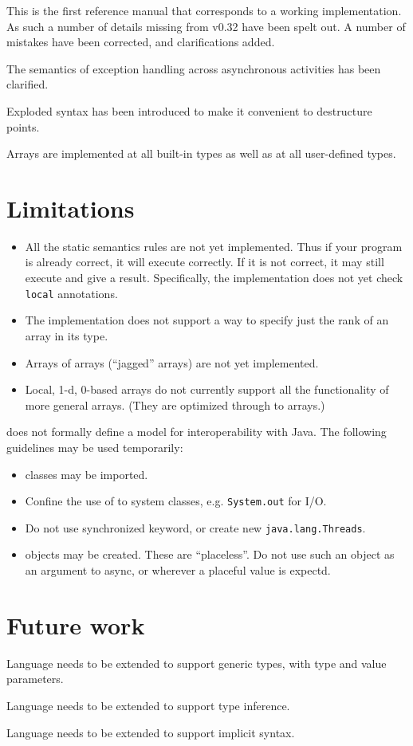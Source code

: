 
This is the first reference manual that corresponds to a working
implementation. As such a number of details missing from v0.32 have
been spelt out. A number of mistakes have been corrected, and
clarifications added.

The semantics of exception handling across asynchronous activities has
been clarified.

Exploded syntax has been introduced to make it convenient to
destructure points. 

Arrays are implemented at all built-in types as well as at all
user-defined types.

\section{Limitations}

\begin{itemize}
\item All the static semantics rules are not yet implemented. 
Thus if your program is already correct, it will execute correctly. If
it is not correct, it may still execute and give a
result. Specifically, the implementation does not yet check {\tt
local} annotations.

\item The implementation does not support a way to specify just the rank of
an array in its type.

\item Arrays of arrays (``jagged'' arrays) are not yet implemented.

\item Local, 1-d, 0-based arrays do not currently support all the
functionality of more general arrays. (They are optimized through to
\Java{} arrays.)

\end{itemize}

\XtenCurrVer{} does not formally define a model for interoperability with
Java. The following guidelines may be used temporarily:

\begin{itemize}
  \item \Java{} classes may be imported.
  \item Confine the use of \Java{} to system classes, e.g.{}
{\tt  System.out} for I/O.
  \item Do not use synchronized keyword, or create new {\tt java.lang.Threads}. 
  \item \Java{} objects may be created. These are ``placeless''. Do not use
     such an object as an argument to async, or wherever a placeful
     value is expectd.
\end{itemize}

\section{Future work}

Language needs to be extended to support generic types, with
type and value parameters.

Language needs to be extended to support type inference.

Language needs to be extended to support implicit syntax.

